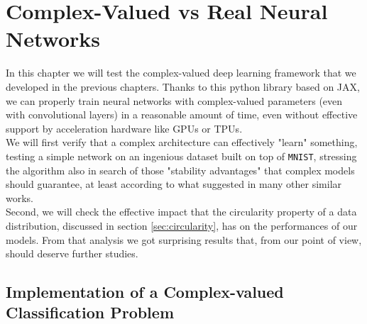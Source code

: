 \documentclass[../main.tex]{subfiles}
\begin{document}
	
\chapter{Complex-Valued vs Real Neural Networks}
\label{ch:cmplx_vs_real}

In this chapter we will test the complex-valued deep learning framework that we developed in the previous chapters. Thanks to this python library based on JAX, we can properly train neural networks with complex-valued parameters (even with convolutional layers) in a reasonable amount of time, even without effective support by acceleration hardware like GPUs or TPUs.\\
We will first verify that a complex architecture can effectively "learn" something, testing a simple network on an ingenious dataset built on top of \texttt{MNIST}, stressing the algorithm also in search of those "stability advantages" that complex models should guarantee, at least according to what suggested in many other similar works.\\
Second, we will check the effective impact that the circularity property of a data distribution, discussed in section \ref{sec:circularity}, has on the performances of our models. From that analysis we got surprising results that, from our point of view, should deserve further studies.

\section{Implementation of a Complex-valued Classification Problem}
\end{document}
